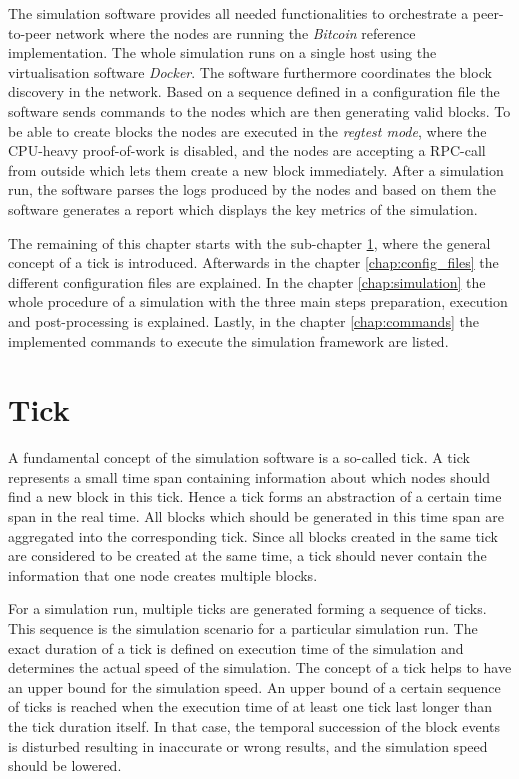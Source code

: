 The simulation software provides all needed functionalities to orchestrate a peer-to-peer network where the nodes are running the \textit{Bitcoin} reference implementation.
The whole simulation runs on a single host using the virtualisation software \textit{Docker}.
The software furthermore coordinates the block discovery in the network.
Based on a sequence defined in a configuration file the software sends commands to the nodes which are then generating valid blocks.
To be able to create blocks the nodes are executed in the \textit{regtest mode}, where the CPU-heavy proof-of-work is disabled, and the nodes are accepting a RPC-call from outside which lets them create a new block immediately.
After a simulation run, the software parses the logs produced by the nodes and based on them the software generates a report which displays the key metrics of the simulation.

The remaining of this chapter starts with the sub-chapter \ref{chap:tick}, where the general concept of a tick is introduced.
Afterwards in the chapter \ref{chap:config_files} the different configuration files are explained.
In the chapter \ref{chap:simulation} the whole procedure of a simulation with the three main steps preparation, execution and post-processing is explained.
Lastly, in the chapter \ref{chap:commands} the implemented commands to execute the simulation framework are listed.
  
\section{Tick}
\label{chap:tick}

A fundamental concept of the simulation software is a so-called tick.
A tick represents a small time span containing information about which nodes should find a new block in this tick.
Hence a tick forms an abstraction of a certain time span in the real time.
All blocks which should be generated in this time span are aggregated into the corresponding tick.
Since all blocks created in the same tick are considered to be created at the same time, a tick should never contain the information that one node creates multiple blocks.

For a simulation run, multiple ticks are generated forming a sequence of ticks.
This sequence is the simulation scenario for a particular simulation run.
The exact duration of a tick is defined on execution time of the simulation and determines the actual speed of the simulation.
The concept of a tick helps to have an upper bound for the simulation speed.
An upper bound of a certain sequence of ticks is reached when the execution time of at least one tick last longer than the tick duration itself.
In that case, the temporal succession of the block events is disturbed resulting in inaccurate or wrong results, and the simulation speed should be lowered.

